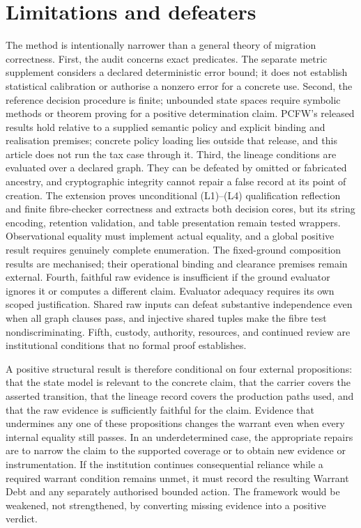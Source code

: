 \documentclass[smallextended,envcountsect,envcountsame,natbib]{svjour3}
\begin{document}
\section{Limitations and defeaters}\label{ex:sec:limitations}
The method is intentionally narrower than a general theory of migration correctness. First, the audit concerns exact predicates. The separate metric supplement considers a declared deterministic error bound; it does not establish statistical calibration or authorise a nonzero error for a concrete use. Second, the reference decision procedure is finite; unbounded state spaces require symbolic methods or theorem proving for a positive determination claim. PCFW's released results hold relative to a supplied semantic policy and explicit binding and realisation premises; concrete policy loading lies outside that release, and this article does not run the tax case through it. Third, the lineage conditions are evaluated over a declared graph. They can be defeated by omitted or fabricated ancestry, and cryptographic integrity cannot repair a false record at its point of creation. The extension proves unconditional (L1)--(L4) qualification reflection and finite fibre-checker correctness and extracts both decision cores, but its string encoding, retention validation, and table presentation remain tested wrappers. Observational equality must implement actual equality, and a global positive result requires genuinely complete enumeration. The fixed-ground composition results are mechanised; their operational binding and clearance premises remain external. Fourth, faithful raw evidence is insufficient if the ground evaluator ignores it or computes a different claim. Evaluator adequacy requires its own scoped justification. Shared raw inputs can defeat substantive independence even when all graph clauses pass, and injective shared tuples make the fibre test nondiscriminating. Fifth, custody, authority, resources, and continued review are institutional conditions that no formal proof establishes.

A positive structural result is therefore conditional on four external propositions: that the state model is relevant to the concrete claim, that the carrier covers the asserted transition, that the lineage record covers the production paths used, and that the raw evidence is sufficiently faithful for the claim. Evidence that undermines any one of these propositions changes the warrant even when every internal equality still passes. In an underdetermined case, the appropriate repairs are to narrow the claim to the supported coverage or to obtain new evidence or instrumentation. If the institution continues consequential reliance while a required warrant condition remains unmet, it must record the resulting Warrant Debt and any separately authorised bounded action. The framework would be weakened, not strengthened, by converting missing evidence into a positive verdict.
\end{document}
